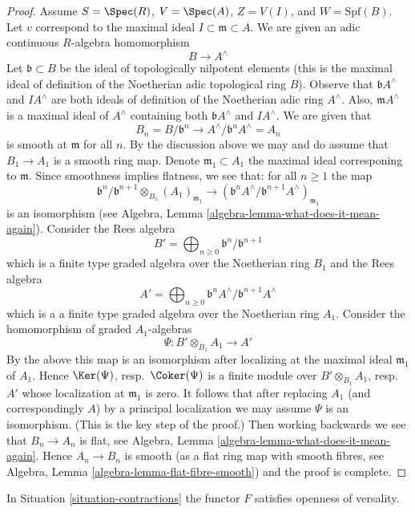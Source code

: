 \begin{proof}
\medskip\noindent
Assume $S = \Spec(R)$, $V = \Spec(A)$, $Z = V(I)$, and $W = \text{Spf}(B)$.
Let $v$ correspond to the maximal ideal $I \subset \mathfrak m \subset A$.
We are given an adic continuous $R$-algebra homomorphism
$$
B \longrightarrow A^\wedge
$$
Let $\mathfrak b \subset B$ be the ideal of topologically nilpotent
elements (this is the maximal ideal of definition of the Noetherian adic
topological ring $B$). Observe that $\mathfrak b A^\wedge$ and
$IA^\wedge$ are both ideals of definition of the Noetherian adic
ring $A^\wedge$. Also, $\mathfrak m A^\wedge$ is a maximal ideal
of $A^\wedge$ containing both $\mathfrak b A^\wedge$ and $IA^\wedge$.
We are given that
$$
B_n = B/\mathfrak b^n \to A^\wedge/\mathfrak b^n A^\wedge = A_n
$$
is smooth at $\mathfrak m$ for all $n$. By the discussion above
we may and do assume that $B_1 \to A_1$ is a smooth ring map.
Denote $\mathfrak m_1 \subset A_1$ the maximal ideal corresponing
to $\mathfrak m$. Since smoothness implies flatness, we see that:
for all $n \geq 1$ the map
$$
\mathfrak b^n/\mathfrak b^{n + 1} \otimes_{B_1} (A_1)_{\mathfrak m_1}
\longrightarrow
\left(\mathfrak b^nA^\wedge/\mathfrak b^{n + 1}A^\wedge\right)_{\mathfrak m_1}
$$
is an isomorphism (see
Algebra, Lemma \ref{algebra-lemma-what-does-it-mean-again}).
Consider the Rees algebra
$$
B' = \bigoplus\nolimits_{n \geq 0} \mathfrak b^n/\mathfrak b^{n + 1}
$$
which is a finite type graded algebra over the Noetherian ring $B_1$ and
the Rees algebra
$$
A' = \bigoplus\nolimits_{n \geq 0}
\mathfrak b^nA^\wedge/\mathfrak b^{n + 1}A^\wedge
$$
which is a a finite type graded algebra over the Noetherian ring $A_1$.
Consider the homomorphism of graded $A_1$-algebras
$$
\Psi : B' \otimes_{B_1} A_1 \longrightarrow A'
$$
By the above this map is an isomorphism after localizing at
the maximal ideal $\mathfrak m_1$ of $A_1$.
Hence $\Ker(\Psi)$, resp.\ $\Coker(\Psi)$ is a finite module
over $B' \otimes_{B_1} A_1$, resp.\ $A'$ whose localization
at $\mathfrak m_1$ is zero. It follows that after replacing
$A_1$ (and correspondingly $A$) by a principal localization
we may assume $\Psi$ is an isomorphism. (This is the key step of the proof.)
Then working backwards we see that $B_n \to A_n$ is flat, see
Algebra, Lemma \ref{algebra-lemma-what-does-it-mean-again}.
Hence $A_n \to B_n$ is smooth (as a flat ring map with smooth
fibres, see Algebra, Lemma \ref{algebra-lemma-flat-fibre-smooth})
and the proof is complete.
\end{proof}

\begin{lemma}
\label{lemma-openness-versality}
In Situation \ref{situation-contractions} the functor
$F$ satisfies openness of versality.
\end{lemma}

